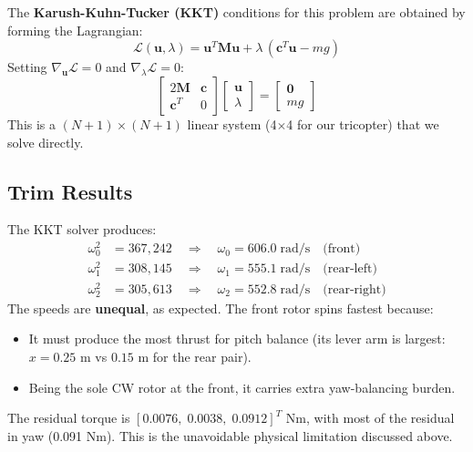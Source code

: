 \documentclass[12pt, a4paper]{article}
\newcommand{\bu}{\bm{u}}
\begin{document}
The \textbf{Karush-Kuhn-Tucker (KKT)} conditions for this problem are obtained by forming the Lagrangian:
\begin{equation}
    \mathcal{L}(\bu, \lambda) = \bu^T \bm{M} \bu + \lambda \, (\bm{c}^T \bu - mg)
\end{equation}
Setting $\nabla_{\bu} \mathcal{L} = 0$ and $\nabla_\lambda \mathcal{L} = 0$:
\begin{equation}
    \begin{bmatrix} 2\bm{M} & \bm{c} \\ \bm{c}^T & 0 \end{bmatrix}
    \begin{bmatrix} \bu \\ \lambda \end{bmatrix}
    = \begin{bmatrix} \bm{0} \\ mg \end{bmatrix}
    \label{eq:kkt}
\end{equation}
This is a $(N{+}1) \times (N{+}1)$ linear system (4$\times$4 for our tricopter) that we solve directly.

\subsection{Trim Results}

The KKT solver produces:
\begin{align}
    \omega_0^2 &= 367{,}242 \quad \Rightarrow \quad \omega_0 = 606.0 \;\text{rad/s} \quad \text{(front)} \\
    \omega_1^2 &= 308{,}145 \quad \Rightarrow \quad \omega_1 = 555.1 \;\text{rad/s} \quad \text{(rear-left)} \\
    \omega_2^2 &= 305{,}613 \quad \Rightarrow \quad \omega_2 = 552.8 \;\text{rad/s} \quad \text{(rear-right)}
\end{align}
The speeds are \textbf{unequal}, as expected.  The front rotor spins fastest because:
\begin{itemize}
    \item It must produce the most thrust for pitch balance (its lever arm is largest: $x = 0.25$ m vs $0.15$ m for the rear pair).
    \item Being the sole CW rotor at the front, it carries extra yaw-balancing burden.
\end{itemize}

The residual torque is $[0.0076, \; 0.0038, \; 0.0912]^T$ Nm, with most of the residual in yaw (0.091 Nm).  This is the unavoidable physical limitation discussed above.
\end{document}
